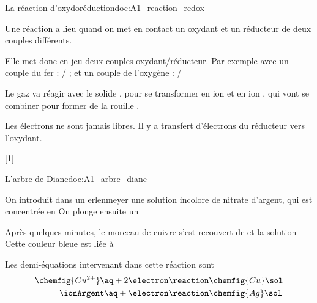 \begin{doc}{La réaction d'oxydoréduction}{doc:A1_reaction_redox}
  \begin{importants}
    Une réaction  a lieu quand on met en contact un oxydant et un réducteur de deux couples différents.
  \end{importants}
  
  Elle met donc en jeu deux couples oxydant/réducteur.
  Par exemple avec un couple du fer : \ionFerIII/ ; et un couple de l'oxygène : \dioxygene/\ionOxygene

  Le gaz \dioxygene va réagir avec le solide , pour se transformer en ion \ionFerIII et en ion \ionOxygene, qui vont se combiner pour former de la rouille .

  \begin{importants}
    Les électrons ne sont jamais libres.
    Il y a transfert d'électrons du réducteur vers l'oxydant.
  \end{importants}
\end{doc}

[1]

\begin{doc}{L'arbre de Diane}{doc:A1_arbre_diane}
  \begin{wrapfigure}[4]{r}{0.1\linewidth}
    \vspace*{-24pt}
  \end{wrapfigure}

  \moleculesGras
  On introduit dans un erlenmeyer une solution incolore de nitrate d'argent, qui est concentrée en 
  On plonge ensuite un 

  Après quelques minutes, le morceau de cuivre s'est recouvert de  et la solution 
  Cette couleur bleue est liée à 
  \moleculesNormale

  Les demi-équations intervenant dans  cette réaction sont
  \begin{align*}
    \chemfig{Cu^{2+}}\aq + 2\electron &\reaction \chemfig{Cu}\sol \\
    \ionArgent\aq + \electron &\reaction \chemfig{Ag}\sol
  \end{align*}
\end{doc}

